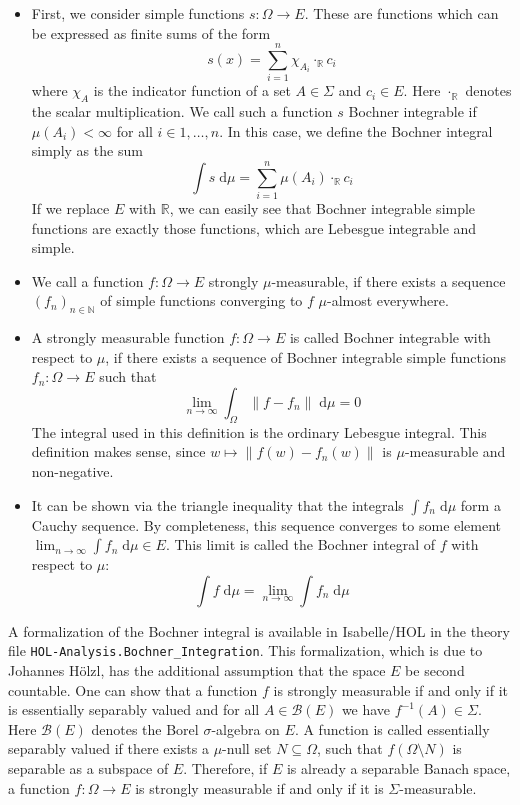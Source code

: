 \begin{itemize}
\item[] First, we consider simple functions $s : \Omega \rightarrow E$. These are functions which can be expressed as finite sums of the form
\[
s(x) = \sum_{i=1}^n \chi_{A_i} \cdot_\mathbb{R} c_i\]
where $\chi_A$ is the indicator function of a set $A \in \Sigma$ and $c_i \in E$. Here $\cdot_\mathbb{R}$ denotes the scalar multiplication. We call such a function $s$ Bochner integrable if $\mu(A_i) < \infty$ for all $i \in {1,\dots,n}$. In this case, we define the Bochner integral simply as the sum
\[
	\int s \; \textrm{d}\mu = \sum_{i=1}^n \mu(A_i) \cdot_\mathbb{R} c_i
\]
If we replace $E$ with $\mathbb{R}$, we can easily see that Bochner integrable simple functions are exactly those functions, which are Lebesgue integrable and simple.
\item[] We call a function $f : \Omega \rightarrow E$ strongly $\mu$-measurable, if there exists a sequence $(f_n)_{n\in\mathbb{N}}$ of simple functions converging to $f$ $\mu$-almost everywhere.
\item[] A strongly measurable function $f : \Omega \rightarrow E$ is called Bochner integrable with respect to $\mu$, if there exists a sequence of Bochner integrable simple functions $f_n : \Omega \rightarrow E$ such that
\[
	\lim_{n \to \infty} \int_\Omega \lVert f - f_n \rVert \; \textrm{d}\mu = 0
\]
The integral used in this definition is the ordinary Lebesgue integral. This definition makes sense, since $w \mapsto \lVert f(w) - f_n(w) \rVert$ is $\mu$-measurable and non-negative.
\item[] It can be shown via the triangle inequality that the integrals $\int f_n\; \textrm{d}\mu$ form a Cauchy sequence. By completeness, this sequence converges to some element $\lim_{n \to \infty} \int f_n \; \textrm{d}\mu \in E$. This limit is called the Bochner integral of $f$ with respect to $\mu$:
\[
	\int f \; \textrm{d}\mu = \lim_{n \to \infty} \int f_n \; \textrm{d}\mu
\]
\end{itemize}

A formalization of the Bochner integral is available in Isabelle/HOL in the theory file \lstinline{HOL-Analysis.Bochner_Integration}. This formalization, which is due to Johannes Hölzl, has the additional assumption that the space $E$ be second countable. One can show that a function $f$ is strongly measurable if and only if it is essentially separably valued and for all $A \in \mathcal{B}(E)$ we have $f^{-1}(A) \in \Sigma$. Here $\mathcal{B}(E)$ denotes the Borel $\sigma$-algebra on $E$. A function is called essentially separably valued if there exists a $\mu$-null set $N \subseteq \Omega$, such that $f (\Omega \setminus N)$ is separable as a subspace of $E$. Therefore, if $E$ is already a separable Banach space, a function $f : \Omega \rightarrow E$ is strongly measurable if and only if it is $\Sigma$-measurable.


